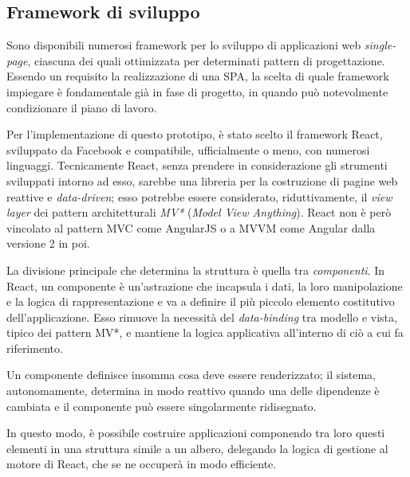     \subsection{Framework di sviluppo}\label{subsec:react}

      Sono disponibili numerosi framework per lo sviluppo di applicazioni web \emph{single-page}, ciascuna dei quali ottimizzata per determinati pattern di progettazione.
      Essendo un requisito la realizzazione di una SPA, la scelta di quale framework impiegare è fondamentale già in fase di progetto, in quando può notevolmente condizionare il piano di lavoro.

      Per l'implementazione di questo prototipo, è stato scelto il framework React, sviluppato da Facebook e compatibile, ufficialmente o meno, con numerosi linguaggi.
      Tecnicamente React, senza prendere in considerazione gli strumenti sviluppati intorno ad esso, sarebbe una libreria per la costruzione di pagine web reattive e \emph{data-driven};
      esso potrebbe essere considerato, riduttivamente, il \emph{view layer} dei pattern architetturali \emph{MV*} (\emph{Model View Anything}).
      React non è però vincolato al pattern MVC come AngularJS o a MVVM come Angular dalla versione 2 in poi.


      La divisione principale che determina la struttura è quella tra \emph{componenti}.
      In React, un componente è un'astrazione che incapsula i dati, la loro manipolazione e la logica di rappresentazione e va a definire il più piccolo elemento costitutivo dell'applicazione.
      Esso rimuove la necessità del \emph{data-binding} tra modello e vista, tipico dei pattern MV*, e mantiene la logica applicativa all'interno di ciò a cui fa riferimento.

      Un componente definisce insomma cosa deve essere renderizzato;
      il sistema, autonomamente, determina in modo reattivo quando una delle dipendenze è cambiata e il componente può essere singolarmente ridisegnato.

      In questo modo, è possibile costruire applicazioni componendo tra loro questi elementi in una struttura simile a un albero, delegando la logica di gestione al motore di React, che se ne occuperà in modo efficiente.

